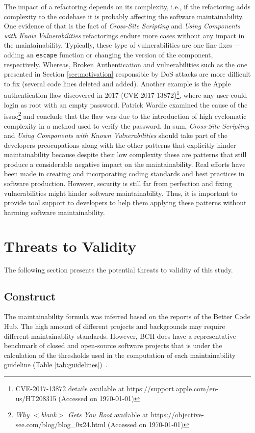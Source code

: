 \documentclass[10pt,conference]{IEEEtran}
\begin{document}
{The impact of a refactoring depends on its complexity, i.e., if the refactoring adds complexity to the codebase it is probably affecting the software maintainability. One evidence of that is the fact of \emph{Cross-Site Scripting} and \emph{Using Components with Know Vulnerabilities} refactorings endure more cases without any impact in the maintainability. Typically, these type of vulnerabilities are one line fixes --- adding an \texttt{escape} function or changing the version of the component, respectively. Whereas, Broken Authentication and vulnerabilities such as the one presented in Section \ref{sec:motivation} responsible by DoS attacks are more difficult to fix (several code lines deleted and added). Another example is the Apple authentication flaw discovered in 2017 (CVE-2017-13872)\footnote{CVE-2017-13872 details available at https://support.apple.com/en-us/HT208315 (Accessed on \today{})}, where any user could login as root with an empty password. Patrick Wardle examined the cause of the issue\footnote{\emph{Why $<$blank$>$ Gets You Root} available at https://objective-see.com/blog/blog\_0x24.html (Accessed on \today{})} and conclude that the flaw was due to the introduction of high cyclomatic complexity in a method used to verify the password. In sum, \emph{Cross-Site Scripting} and \emph{Using Components with Known Vulnerabilities} should take part of the developers preocupations along with the other patterns that explicitly hinder maintainability because despite their low complexity these are patterns that still produce a considerable negative impact on the maintainability. Real efforts have been made in creating and incorporating coding standards and best practices in software production. However, security is still far from perfection and fixing vulnerabilities might hinder software maintainability. Thus, it is important to provide tool support to developers to help them applying these patterns without harming software maintainability.

\section{Threats to Validity}\label{sec:threats}
%
The following section presents the potential threats to validity of this study.
%
\subsection{Construct}
%
The maintainability formula was inferred based on the reports of the Better Code Hub.
The high amount of different projects and backgrounds may require different maintainablity
standards. However, BCH does have a representative benchmark of closed and open-source 
software projects that is under the calculation of the thresholds used in the computation 
of each maintainability guideline (Table \ref{tab:guidelines})~\cite{Visser:2016:OREILLY, 
Baggen2012}.

}
\end{document}
